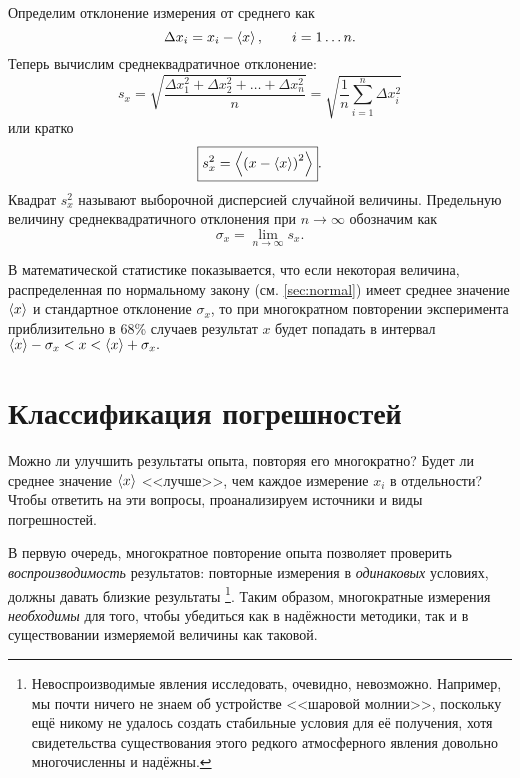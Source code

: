 Определим отклонение измерения от среднего как
\[
\Delta x_{i}=x_{i}-\left<x\right>,\qquad i=1\ldots n.
\]
Теперь вычислим среднеквадратичное отклонение:
\begin{equation}
    s_{x}=\sqrt{\frac{\Delta x_{1}^{2}+\Delta x_{2}^{2}+\ldots+\Delta
x_{n}^{2}}{n}}=\sqrt{\frac{1}{n}\sum\limits _{i=1}^{n}\Delta
x_{i}^{2}}\label{eq:sigma}
\end{equation}
или кратко
\begin{equation}
\boxed{s_{x}^{2}=\left<\left(x-\left<x\right>\right)^{2}\right>}.\label{eq:sigma_s}
\end{equation}
Квадрат $s_{x}^{2}$ называют выборочной дисперсией случайной величины.
Предельную величину среднеквадратичного отклонения
при $n\to\infty$ обозначим как
\[
\sigma_{x}=\lim\limits _{n\to\infty}s_{x}.
\]

В математической статистике показывается, что если некоторая величина,
распределенная по нормальному закону (см. \ref{sec:normal}) имеет среднее
значение $\left<x\right>$ и стандартное отклонение $\sigma_x$, то при многократном
повторении эксперимента приблизительно в 68\% случаев результат $x$ будет
попадать в интервал $\left<x\right>-\sigma_{x}<x<\left<x\right>+\sigma_{x}.$


%

\section{Классификация погрешностей}

Можно ли улучшить результаты опыта, повторяя его многократно? Будет
ли среднее значение $\left<x\right>$ <<лучше>>,
чем каждое измерение $x_{i}$ в отдельности? Чтобы ответить на эти
вопросы, проанализируем источники и виды погрешностей.

В первую очередь, многократное повторение опыта позволяет проверить
\emph{воспроизводимость} результатов: повторные измерения в \emph{одинаковых}
условиях, должны давать близкие результаты \footnote{Невоспроизводимые явления
исследовать, очевидно, невозможно. Например,
мы почти ничего не знаем об устройстве <<шаровой молнии>>,
поскольку ещё никому не удалось создать стабильные условия для её
получения, хотя свидетельства существования этого редкого атмосферного
явления довольно многочисленны и надёжны.}.
Таким образом, многократные измерения \emph{необходимы} для того,
чтобы убедиться как в надёжности методики, так и в существовании измеряемой
величины как таковой.

